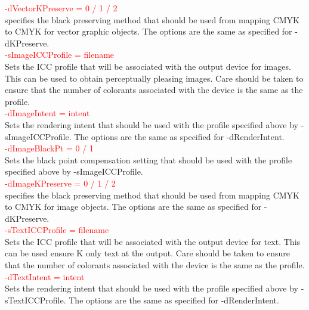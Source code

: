 \documentclass[12pt,notitlepage]{article}
\begin{document}
\textcolor{red}{-dVectorKPreserve = 0 / 1 / 2}\\

\noindent specifies the black preserving method that should be used from mapping CMYK to CMYK for vector graphic objects.   The
options are the same as specified for -dKPreserve.\\

\textcolor{red}{-sImageICCProfile = filename}\\

\noindent Sets the ICC profile that will be associated with the output device for images.  This can be used to obtain perceptually pleasing images.
Care should be taken to ensure that the number of colorants associated with the device is the same as the profile. \\

\textcolor{red}{-dImageIntent = intent}\\

\noindent Sets the rendering intent that should be used with the profile specified above by -sImageICCProfile. The options are the same as specified for -dRenderIntent. \\

\textcolor{red}{-dImageBlackPt = 0 / 1}\\

\noindent Sets the black point compensation setting that should be used with the profile specified above by -sImageICCProfile.\\

\textcolor{red}{-dImageKPreserve = 0 / 1 / 2}\\

\noindent specifies the black preserving method that should be used from mapping CMYK to CMYK for image objects.   The
options are the same as specified for -dKPreserve.\\

\textcolor{red}{-sTextICCProfile = filename}\\

\noindent Sets the ICC profile that will be associated with the output device for text.  This can be used ensure K only text at the output. Care should be taken to ensure that the number of colorants associated with the device is the same as the profile.\\

\textcolor{red}{-dTextIntent = intent}\\

\noindent Sets the rendering intent that should be used with the profile specified above by -sTextICCProfile. The options are the same as specified for -dRenderIntent. \\
\end{document}
